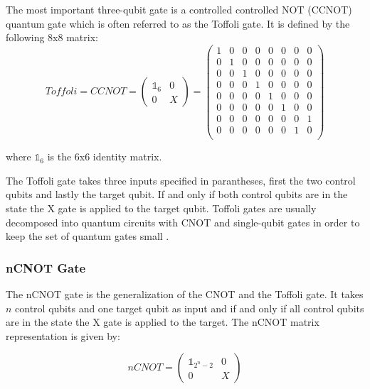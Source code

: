 The most important three-qubit gate is a controlled controlled NOT (CCNOT) quantum gate which is often referred to as the Toffoli gate. It is defined by the following 8x8 matrix:
\begin{equation}
Toffoli = CCNOT = \begin{pmatrix}
 \mathbb{1}_6 & 0 \\ 
 0 & X
 \end{pmatrix} = \begin{pmatrix}
 1 & 0 & 0 & 0 & 0 & 0 & 0 & 0 \\ 
 0 & 1 & 0 & 0 & 0 & 0 & 0 & 0 \\ 
 0 & 0 & 1 & 0 & 0 & 0 & 0 & 0 \\ 
 0 & 0 & 0 & 1 & 0 & 0 & 0 & 0 \\ 
 0 & 0 & 0 & 0 & 1 & 0 & 0 & 0 \\ 
 0 & 0 & 0 & 0 & 0 & 1 & 0 & 0 \\
 0 & 0 & 0 & 0 & 0 & 0 & 0 & 1 \\ 
 0 & 0 & 0 & 0 & 0 & 0 & 1 & 0 \\ 
 \end{pmatrix}
\end{equation}

where $\mathbb{1}_6$ is the 6x6 identity matrix.

The Toffoli gate takes three inputs specified in parantheses, first the two control qubits and lastly the target qubit. If and only if both control qubits are in the \1 state the X gate is applied to the target qubit. Toffoli gates are usually decomposed into quantum circuits with CNOT and single-qubit gates in order to keep the set of quantum gates small \cite{shende2008cnot}.

\subsubsection{nCNOT Gate}
\label{subsubsubsec:ncnotgate}

The nCNOT gate is the generalization of the CNOT and the Toffoli gate. It takes $n$ control qubits and one target qubit as input and if and only if all control qubits are in the \1 state the X gate is applied to the target. The nCNOT matrix representation is given by:
 
\begin{equation}
nCNOT = \begin{pmatrix}
 \mathbb{1}_{2^n-2} & 0 \\ 
 0 & X
 \end{pmatrix}
\end{equation}

